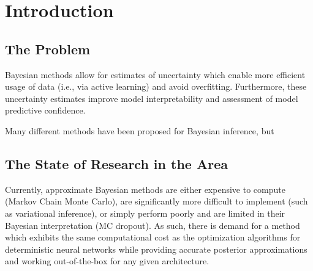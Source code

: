 \chapter{Introduction}

\section{The Problem}


Bayesian methods allow for estimates of uncertainty which enable more
efficient usage of data (i.e., via active learning) and avoid
overfitting. Furthermore, these uncertainty estimates improve model
interpretability and assessment of model predictive confidence.


Many different methods have been proposed for Bayesian inference, but

\section{The State of Research in the Area}
%
Currently, approximate Bayesian methods are either expensive to compute
(Markov Chain Monte Carlo), are significantly more difficult to implement (such as
variational inference), or simply perform poorly and are limited in
their Bayesian interpretation (MC dropout). As such, there is demand for
a method which exhibits the same computational cost as the optimization
algorithms for deterministic neural networks while providing accurate
posterior approximations and working out-of-the-box for any given
architecture.


